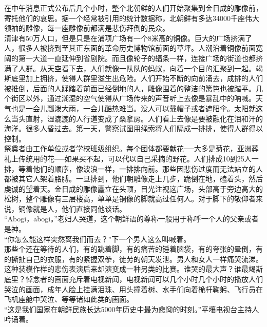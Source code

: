 在中午消息正式公布后几个小时，整个北朝鲜的人们开始聚集到金日成的雕像前，寄托他们的哀思。据一个经常被引用的统计数据称，北朝鲜有多达34000千座伟大领袖的雕像，每一座雕像前都满是悲伤拜倒的民众。\\

清津有50万人口，但是只是在浦项广场有一个8米高的铜像。巨大的广场挤满了人，很多人被挤到至其正东面的革命历史博物馆前面的草坪。人潮沿着铜像前面宽阔的第一大道一直延伸到省剧院。而且像轮子的辐条一样，连接广场的街道也都挤满了人群。从天空看下去，人们就像一队队的蚂蚁，向着一个目的汇聚到一起。竭斯底里加上拥挤，使得人群里滋生出危险。人们开始不断的向前涌去，成排的人们被推倒，后面的人踩踏着前面已经倒地的人，雕像围着的整洁的篱笆也被踏平。几个街区以外，通过潮湿的空气使得从广场传来的声音听上去像是暴乱中的呐喊。天气也是一会儿瓢泼大雨，一会儿酷热难当。没人可以戴帽子或者遮阳伞。太阳就这么当头直射，湿漉漉的人行道变成了桑拿房。人们看上去像是要被融化在泪和汗的海洋。很多人昏过去。第一天，警察试图用绳索将人们隔成一排排，使得人群得以控制。\\

祭奠者由工作单位或者学校班级组织。每个团体都要献花──大多是菊花，亚洲葬礼上传统用的花──如果买不起，可以代以自己采摘的野花。人们排成10到25人一排，等着他们的顺序，像波浪一样，一排排向前。那些因悲伤过度而无法站立的人都被其它人架着胳膊。一旦排到，他们朝雕像走上几步，跪倒在地，磕着头，然后虔诚的望着天。金日成的雕像矗立在头顶，目光注视这广场，头部高于旁边高大的松树，整个雕像有三层楼高，单单是铜像的脚就高过任何人。对于脚下的敬仰者来说，铜像就是人，他们直接同他谈话。\\

“Abogi，abogi。”老妇人哭道，这个朝鲜语的尊称一般用于称呼一个人的父亲或者是神。\\

“你怎么能这样突然离我们而去？”下一个男人这么叫喊着。\\

那些个还在等待的人们，有的跳着脚，有的痛苦的锤着脑袋，有的夸张的晕倒，有的撕扯自己的衣服，有的紧握双拳，徒劳的朝天发泄。男人和女人一样痛哭流涕。\\

这种装模作样的悲伤表演后来却演变成一种另类的比赛。谁哭的最大声？谁最竭斯底里？悼念者的画面充斥着电视新闻，电视新闻可以几个小时几个小时的播放人们哭泣的画面，成年人脸上挂满泪珠、用头撞着树、水手们向着桅杆鞠躬、飞行员在飞机座舱中哭泣、等等诸如此类的画面。\\

“这是我们国家在朝鲜民族长达5000年历史中最为悲恸的时刻。”平壤电视台主持人吟诵着。\\

